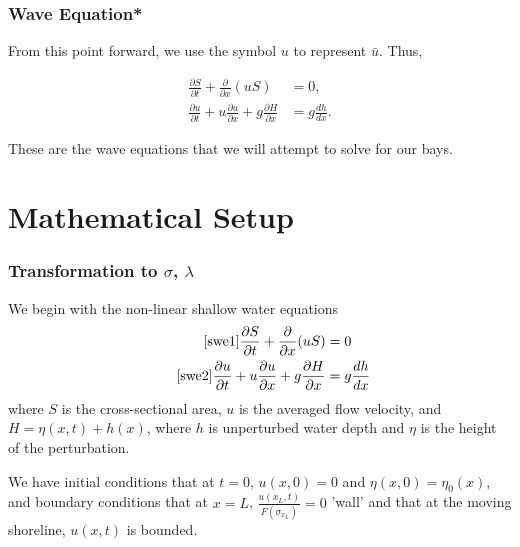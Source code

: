 	

	\begin{frame}
		\frametitle{Wave Equation*}
		From this point forward, we use the symbol $u$ to represent $\bar{u}$.  Thus,
		\begin{framed} \begin{align}
			\frac{\partial S}{\partial t} + \frac{\partial}{\partial x}(uS) &= 0, \label{swe1}\\
			\frac{\partial u}{\partial t} + u \frac{\partial u}{\partial x} + g \frac{\partial H}{\partial x} &= g \frac{dh}{dx}. \label{swe2}
		\end{align} \end{framed}
		These are the wave equations that we will attempt to solve for our bays.
	\end{frame}


\section{Mathematical Setup}

	\begin{frame}
		\frametitle{Transformation to $\sigma$, $\lambda$}
		We begin with the non-linear shallow water equations
		\begin{align} 
			\tag*{\eqref{swe1}}
			\frac{\partial S}{\partial t} + \frac{\partial}{\partial x} (uS) &= 0  \\
			\tag*{\eqref{swe2}}
			\frac{\partial u}{\partial t} + u \frac{\partial u}{\partial x} + g \frac{\partial H}{\partial x} &= g \frac{dh}{dx}
		\end{align}
		where $S$ is the cross-sectional area, $u$ is the averaged flow velocity, and $H = \eta(x,t) + h(x)$, where $h$ is unperturbed water depth and $\eta$ is the height of the perturbation.
		
		We have initial conditions that at $t=0$, $u(x,0) = 0$ and $\eta(x,0) = \eta_0(x)$, and boundary conditions that at $x=L$, $\frac{u(x_L,t)}{F(\sigma_{x_L})}=0$ 'wall' and that at the moving shoreline, $u(x,t)$ is bounded.
		
	\end{frame}


